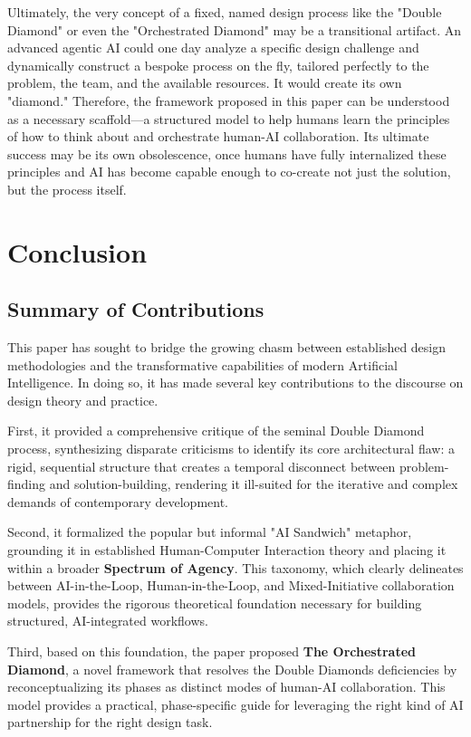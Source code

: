 \documentclass[
  12pt,
  a4paper,
  bibliography=totoc,
  numbers=noenddot
]{scrartcl}
\begin{document}
Ultimately, the very concept of a fixed, named design process like the
"Double Diamond" or even the "Orchestrated Diamond" may be a
transitional artifact. An advanced agentic AI could one day analyze a
specific design challenge and dynamically construct a bespoke process on
the fly, tailored perfectly to the problem, the team, and the available
resources. It would create its own "diamond." Therefore, the framework
proposed in this paper can be understood as a necessary scaffold---a
structured model to help humans learn the principles of how to think
about and orchestrate human-AI collaboration. Its ultimate success may
be its own obsolescence, once humans have fully internalized these
principles and AI has become capable enough to co-create not just the
solution, but the process itself.

\section{
Conclusion}\label{section-7-conclusion}

\subsection{Summary of
Contributions}\label{summary-of-contributions}

This paper has sought to bridge the growing chasm between established
design methodologies and the transformative capabilities of modern
Artificial Intelligence. In doing so, it has made several key
contributions to the discourse on design theory and practice.

First, it provided a comprehensive critique of the seminal Double
Diamond process, synthesizing disparate criticisms to identify its core
architectural flaw: a rigid, sequential structure that creates a
temporal disconnect between problem-finding and solution-building,
rendering it ill-suited for the iterative and complex demands of
contemporary development.

Second, it formalized the popular but informal "AI Sandwich" metaphor,
grounding it in established Human-Computer Interaction theory and
placing it within a broader \textbf{Spectrum of Agency}. This taxonomy,
which clearly delineates between AI-in-the-Loop, Human-in-the-Loop, and
Mixed-Initiative collaboration models, provides the rigorous theoretical
foundation necessary for building structured, AI-integrated workflows.

Third, based on this foundation, the paper proposed \textbf{The
Orchestrated Diamond}, a novel framework that resolves the Double
Diamond\textquotesingle s deficiencies by reconceptualizing its phases
as distinct modes of human-AI collaboration. This model provides a
practical, phase-specific guide for leveraging the right kind of AI
partnership for the right design task.
\end{document}
